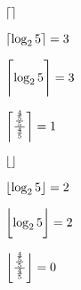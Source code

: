 \documentclass{article}
\begin{document}
    \( \Ceil{} \)

    \( \Ceil{\log_2 5} = 3 \)

    \( \Ceil[\Bigg]{\log_2 5} = 3 \)

    \( \Ceil*{\frac{\frac{\frac{4}{5}}{5}}{\frac{4}{5}}} = 1\)

    \( \Floor{} \)

    \( \Floor{\log_2 5} = 2  \)

    \( \Floor[\bigg]{\log_2 5} = 2  \)

    \( \Floor*{\frac{\frac{\frac{4}{5}}{5}}{\frac{4}{5}}} = 0\)
\end{document}

